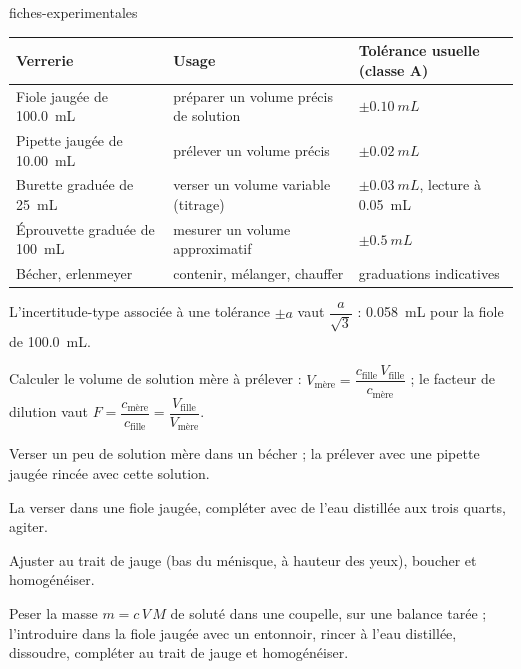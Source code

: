 \begin{blocEdition}{fiches-experimentales}
\fontsize{10}{13.5}\selectfont
\label{figedition-fiches-1}
{\small\begin{tabularx}{\linewidth}{@{}lYl@{}}\toprule
\textbf{Verrerie} & \textbf{Usage} & \textbf{Tolérance usuelle (classe A)} \\\midrule
Fiole jaugée de \qty{100,0}{mL} & préparer un volume précis de solution & $\pm\qty{0,10}{mL}$ \\
Pipette jaugée de \qty{10,00}{mL} & prélever un volume précis & $\pm\qty{0,02}{mL}$ \\
Burette graduée de \qty{25}{mL} & verser un volume variable (titrage) & $\pm\qty{0,03}{mL}$, lecture à \qty{0,05}{mL} \\
Éprouvette graduée de \qty{100}{mL} & mesurer un volume approximatif & $\pm\qty{0,5}{mL}$ \\
Bécher, erlenmeyer & contenir, mélanger, chauffer & graduations indicatives \\\bottomrule
\end{tabularx}}\par\smallskip
L'incertitude-type associée à une tolérance $\pm a$ vaut $\dfrac{a}{\sqrt3}$ : \qty{0,058}{mL} pour la fiole de \qty{100,0}{mL}.
\begin{questions}
\item Calculer le volume de solution mère à prélever : $V_\text{mère}=\dfrac{c_\text{fille}\,V_\text{fille}}{c_\text{mère}}$ ; le facteur de dilution vaut
$F=\dfrac{c_\text{mère}}{c_\text{fille}}=\dfrac{V_\text{fille}}{V_\text{mère}}$.
\item Verser un peu de solution mère dans un bécher ; la prélever avec une pipette jaugée rincée avec cette solution.
\item La verser dans une fiole jaugée, compléter avec de l'eau distillée aux trois quarts, agiter.
\item Ajuster au trait de jauge (bas du ménisque, à hauteur des yeux), boucher et homogénéiser.
\end{questions}
Peser la masse $m=c\,V\,M$ de soluté dans une coupelle, sur une balance tarée ; l'introduire dans la fiole jaugée avec un
entonnoir, rincer à l'eau distillée, dissoudre, compléter au trait de jauge et homogénéiser.
\end{blocEdition}

